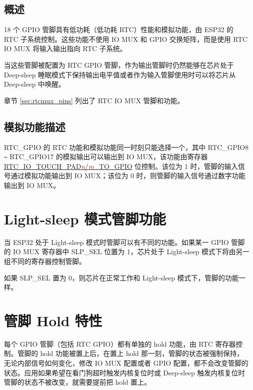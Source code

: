 \documentclass[main\_\_CN.tex]{subfiles}
\begin{document}
\subsection{概述}

18 个 GPIO 管脚具有低功耗（低功耗 RTC）性能和模拟功能，由 ESP32 的 RTC 子系统控制。这些功能不使用 IO MUX 和 GPIO 交换矩阵，而是使用 RTC IO MUX 将输入输出指向 RTC 子系统。

当这些管脚被配置为 RTC GPIO 管脚，作为输出管脚时仍然能够在芯片处于 Deep-sleep 睡眠模式下保持输出电平值或者作为输入管脚使用时可以将芯片从 Deep-sleep 中唤醒。

章节 \ref{sec:rtcmux_pins} 列出了 RTC IO MUX 管脚和功能。

\subsection{模拟功能描述}\label{sec:rtc_gpio_analog_func}

RTC\_GPIO 的 RTC 功能和模拟功能同一时刻只能选择一个，其中 RTC\_GPIO8 \verb+~+ RTC\_GPIO17 的模拟输出可以输出到 IO MUX，该功能由寄存器 \hyperref[regdesc:RTCIOTOUCHPADnREG]{RTC\_IO\_TOUCH\_PAD\textcolor{red}{\it{n}}/\textcolor{red}{\it{m}}\_TO\_GPIO} 位控制。该位为 1 时，管脚的输入信号通过模拟功能输出到 IO MUX；该位为 0 时，则管脚的输入信号通过数字功能输出到 IO MUX。

\section{Light-sleep 模式管脚功能}

当 ESP32 处于 Light-sleep 模式时管脚可以有不同的功能。如果某一 GPIO 管脚的 IO MUX 寄存器中 SLP\_SEL 位置为 1，芯片处于 Light-sleep 模式下将由另一组不同的寄存器控制管脚。




如果 SLP\_SEL 置为 0，则芯片在正常工作和 Light-sleep 模式下，管脚的功能一样。

\section{管脚 Hold 特性}\label{PadHold}

每个 GPIO 管脚（包括 RTC GPIO）都有单独的 hold 功能，由 RTC 寄存器控制。管脚的 hold 功能被置上后，在置上 hold 那一刻，管脚的状态被强制保持，无论内部信号如何变化，修改 IO MUX 配置或者 GPIO 配置，都不会改变管脚的状态。应用如果希望在看门狗超时触发内核复位时或 Deep-sleep 触发内核复位时管脚的状态不被改变，就需要提前把 hold 置上。
\end{document}
